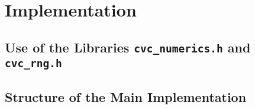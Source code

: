 \section{Implementation}

\subsection{Use of the Libraries \texttt{cvc\_numerics.h} and \texttt{cvc\_rng.h}}

\subsection{Structure of the Main Implementation}